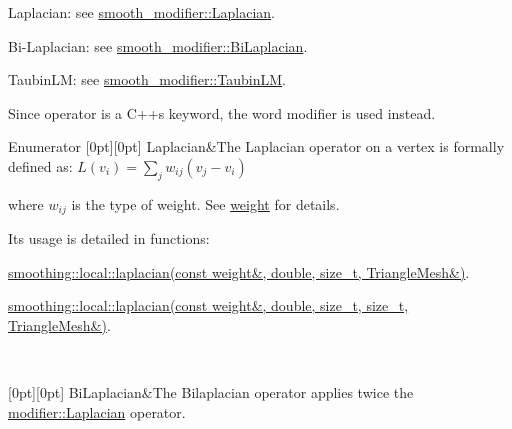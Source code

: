 \begin{DoxyItemize}
\item Laplacian\+: see \hyperlink{namespacegeoproc_a396280579199558902594f4df72c01c7a799723f39baf497704a3d39e7c03555f}{smooth\+\_\+modifier\+::\+Laplacian}.
\item Bi-\/\+Laplacian\+: see \hyperlink{namespacegeoproc_a396280579199558902594f4df72c01c7a0890724bffb79f511bc768c0529dce3f}{smooth\+\_\+modifier\+::\+Bi\+Laplacian}.
\item Taubin\+LM\+: see \hyperlink{namespacegeoproc_a396280579199558902594f4df72c01c7ad69ec4945f39affa518f05fa077b00ae}{smooth\+\_\+modifier\+::\+Taubin\+LM}.
\end{DoxyItemize}

Since \textquotesingle{}operator\textquotesingle{} is a C++\textquotesingle{}s keyword, the word \textquotesingle{}modifier\textquotesingle{} is used instead. \begin{DoxyEnumFields}{Enumerator}
[0pt][0pt]{}\mbox{\label{namespacegeoproc_a396280579199558902594f4df72c01c7a799723f39baf497704a3d39e7c03555f}} 
Laplacian&The Laplacian operator on a vertex is formally defined as\+: $ L(v_i) = \sum_{j} w_{ij}(v_j - v_i) $

where $w_{ij}$ is the type of weight. See \hyperlink{namespacegeoproc_a12e5a10581b53b9dd9a509127527f843}{weight} for details.

Its usage is detailed in functions\+:
\begin{DoxyItemize}
\item \hyperlink{namespacegeoproc_1_1smoothing_1_1local_aca304df02cb346b9786b22fa3fb80c88}{smoothing\+::local\+::laplacian(const weight\&, double, size\+\_\+t, Triangle\+Mesh\&)}.
\item \hyperlink{namespacegeoproc_1_1smoothing_1_1local_aeb4e9f73796dce51c4dcac3c1e824fa7}{smoothing\+::local\+::laplacian(const weight\&, double, size\+\_\+t, size\+\_\+t, Triangle\+Mesh\&)}. 
\end{DoxyItemize}\\
\hline

[0pt][0pt]{}\mbox{\label{namespacegeoproc_a396280579199558902594f4df72c01c7a0890724bffb79f511bc768c0529dce3f}} 
Bi\+Laplacian&The Bilaplacian operator applies twice the \hyperlink{namespacegeoproc_a396280579199558902594f4df72c01c7a799723f39baf497704a3d39e7c03555f}{modifier\+::\+Laplacian} operator.


\end{DoxyEnumFields}
